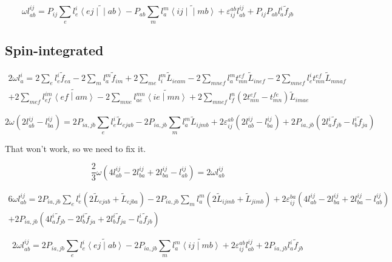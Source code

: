 \documentclass{article}
\newcommand{\tei}[2]{\left<{#1}\middle|\middle|{#2}\right>}
\begin{document}
\begin{equation}
  \omega l_{ab}^{ij} = P_{ij}\sum_el_e^i\widetilde{\tei{ej}{ab}} - P_{ab}\sum_ml_a^m\widetilde{\tei{ij}{mb}} + \varepsilon_{ij}^{ab}l_{ab}^{ij} + P_{ij}P_{ab}l_a^i\tilde{f}_{jb}
\end{equation}

\subsection{Spin-integrated}

\begin{multline}
  2\omega l_a^i = 2\sum_el_e^i\tilde{f}_{ea} - 2\sum_ml_a^m\tilde{f}_{im} + 2\sum_{me}l_i^m\tilde{L}_{ieam} - 2\sum_{mnef}l_a^mt_{mn}^{ef}\tilde{L}_{inef} - 2\sum_{mnef}l_e^it_{mn}^{ef}\tilde{L}_{mnaf}\\
  + 2\sum_{mef}l_{ef}^{im}\widetilde{\left<ef\middle|am\right>} - 2\sum_{mne}l_{ae}^{mn}\widetilde{\left<ie\middle|mn\right>} + 2\sum_{mnef}l_f^n\left(2t_{mn}^{ef} - t_{mn}^{fe}\right)\tilde{L}_{imae}
\end{multline}

\begin{equation}
  2\omega \left(2l_{ab}^{ij} - l_{ba}^{ij}\right) = 2P_{ia,jb}\sum_el_e^i\tilde{L}_{ejab} - 2P_{ia,jb}\sum_ml_a^m\tilde{L}_{ijmb} + 2\varepsilon_{ij}^{ab}\left(2l_{ab}^{ij}  - l_{ba}^{ij}\right)+ 2P_{ia,jb}\left(2l_a^i\tilde{f}_{jb} - l_b^i\tilde{f}_{ja}\right)
\end{equation}

That won't work, so we need to fix it.

\begin{equation}
  \frac{2}{3}\omega\left(4l_{ab}^{ij} - 2l_{ba}^{ij} + 2l_{ba}^{ij} - l_{ab}^{ij}\right) = 2\omega l_{ab}^{ij}
\end{equation}

\begin{multline}
  6\omega l_{ab}^{ij} = 2P_{ia,jb}\sum_el_e^i\left(2\tilde{L}_{ejab} + \tilde{L}_{ejba}\right) - 2P_{ia,jb}\sum_ml_a^m\left(2\tilde{L}_{ijmb} + \tilde{L}_{jimb}\right) + 2\varepsilon_{ij}^{ba}\left(4l_{ab}^{ij}  - 2l_{ba}^{ij} + 2l_{ba}^{ij} - l_{ab}^{ij}\right)\\
  + 2P_{ia,jb}\left(4l_a^i\tilde{f}_{jb} - 2l_b^i\tilde{f}_{ja} + 2l_b^i\tilde{f}_{ja} - l_a^i\tilde{f}_{jb}\right)
\end{multline}

\begin{equation}
  2\omega l_{ab}^{ij} = 2P_{ia,jb}\sum_el_e^i\widetilde{\left<ej\middle|ab\right>} - 2P_{ia,jb}\sum_ml_a^m\widetilde{\left<ij\middle|mb\right>} + 2\varepsilon_{ij}^{ab}l_{ab}^{ij} + 2P_{ia,jb}l_a^i\tilde{f}_{jb}
\end{equation}
\end{document}
